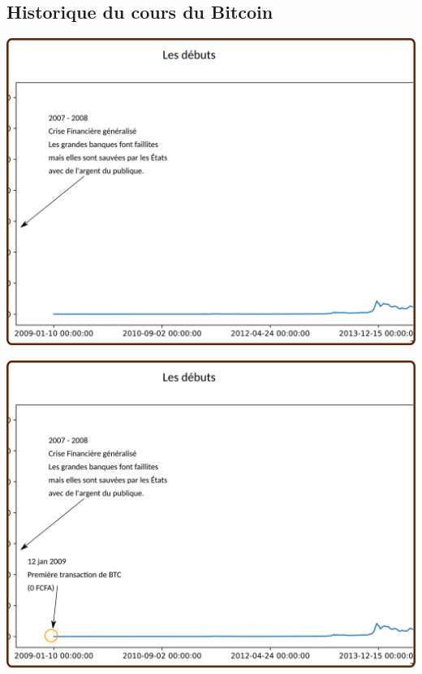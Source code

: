 \documentclass[presentation]{beamer}
\begin{document}
\subsection{Historique du cours du Bitcoin}
\label{sec:org2d3b012}
\begin{frame}[label={sec:orgbef6b76}]{}
\begin{center}
\includegraphics[width=.95\textwidth]{./Pictures/Timeline/00debut0.png}
\end{center}
\end{frame}
\begin{frame}[label={sec:org67a4773}]{}
\begin{center}
\includegraphics[width=.95\textwidth]{./Pictures/Timeline/01debut_prix_crea.png}
\end{center}
\end{frame}
\end{document}
